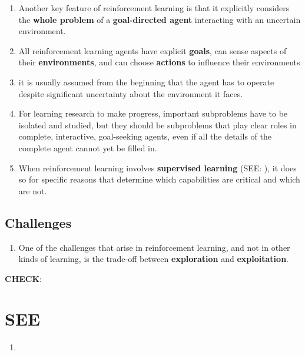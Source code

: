 \begin{enumerate}
    \item Another key feature of reinforcement learning is that it explicitly considers the \textbf{whole problem} of a \textbf{goal-directed agent} interacting with an uncertain environment.

    \item All reinforcement learning agents have explicit \textbf{goals}, can sense aspects of their \textbf{environments}, and can choose \textbf{actions} to influence their environments

    \item it is usually assumed from the beginning that the agent has to operate despite significant uncertainty about the environment it faces.

    \item  For learning research to make progress, important subproblems have to be isolated and studied, but they should be subproblems that play clear roles in complete, interactive, goal-seeking agents, even if all the details of the complete agent cannot yet be filled in.

    \item When reinforcement learning involves \textbf{supervised learning} (SEE: ), it does so for specific reasons that determine which capabilities are critical and which are not.
\end{enumerate}

\subsection*{Challenges \cite{drl-1}}
\begin{enumerate}
    \item One of the challenges that arise in reinforcement learning, and not in other kinds of learning, is the trade-off between \textbf{exploration} and \textbf{exploitation}.

    
\end{enumerate}

\vspace{0.2cm}
\noindent
\textbf{CHECK}: 

\section*{SEE}

\begin{enumerate}
    \item {}
\end{enumerate}








